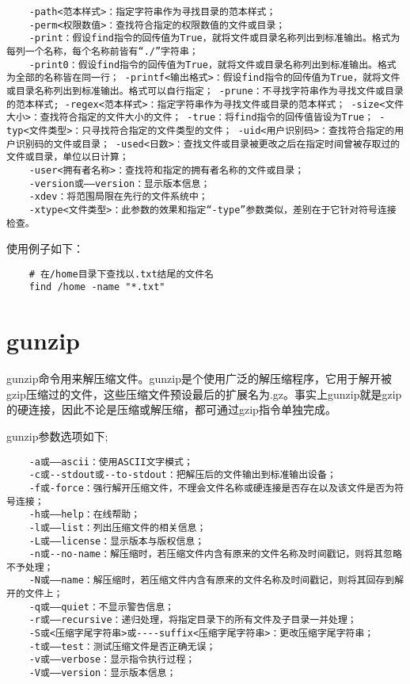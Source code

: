 \documentclass[a4paper,left=2.5cm,right=2.5cm,11pt]{article}
\begin{document}
\begin{lstlisting}
	-path<范本样式>：指定字符串作为寻找目录的范本样式； 
	-perm<权限数值>：查找符合指定的权限数值的文件或目录； 
	-print：假设find指令的回传值为True，就将文件或目录名称列出到标准输出。格式为每列一个名称，每个名称前皆有“./”字符串； 
	-print0：假设find指令的回传值为True，就将文件或目录名称列出到标准输出。格式为全部的名称皆在同一行； -printf<输出格式>：假设find指令的回传值为True，就将文件或目录名称列出到标准输出。格式可以自行指定； -prune：不寻找字符串作为寻找文件或目录的范本样式; -regex<范本样式>：指定字符串作为寻找文件或目录的范本样式； -size<文件大小>：查找符合指定的文件大小的文件； -true：将find指令的回传值皆设为True； -typ<文件类型>：只寻找符合指定的文件类型的文件； -uid<用户识别码>：查找符合指定的用户识别码的文件或目录； -used<日数>：查找文件或目录被更改之后在指定时间曾被存取过的文件或目录，单位以日计算； 
	-user<拥有者名称>：查找符和指定的拥有者名称的文件或目录； 
	-version或——version：显示版本信息； 
	-xdev：将范围局限在先行的文件系统中； 
	-xtype<文件类型>：此参数的效果和指定“-type”参数类似，差别在于它针对符号连接检查。
	\end{lstlisting}

	使用例子如下：
	\begin{lstlisting}
	# 在/home目录下查找以.txt结尾的文件名
	find /home -name "*.txt"
	\end{lstlisting}

\section{gunzip}
	gunzip命令用来解压缩文件。gunzip是个使用广泛的解压缩程序，它用于解开被gzip压缩过的文件，这些压缩文件预设最后的扩展名为.gz。事实上gunzip就是gzip的硬连接，因此不论是压缩或解压缩，都可通过gzip指令单独完成。\par

	gunzip参数选项如下;
	\begin{lstlisting}
	-a或——ascii：使用ASCII文字模式； 
	-c或--stdout或--to-stdout：把解压后的文件输出到标准输出设备； 
	-f或-force：强行解开压缩文件，不理会文件名称或硬连接是否存在以及该文件是否为符号连接； 
	-h或——help：在线帮助； 
	-l或——list：列出压缩文件的相关信息； 
	-L或——license：显示版本与版权信息； 
	-n或--no-name：解压缩时，若压缩文件内含有原来的文件名称及时间戳记，则将其忽略不予处理； 
	-N或——name：解压缩时，若压缩文件内含有原来的文件名称及时间戳记，则将其回存到解开的文件上； 
	-q或——quiet：不显示警告信息； 
	-r或——recursive：递归处理，将指定目录下的所有文件及子目录一并处理； 
	-S或<压缩字尾字符串>或----suffix<压缩字尾字符串>：更改压缩字尾字符串； 
	-t或——test：测试压缩文件是否正确无误； 
	-v或——verbose：显示指令执行过程； 
	-V或——version：显示版本信息；
	\end{lstlisting}
\end{document}
